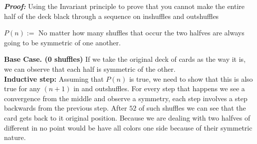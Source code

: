 \documentclass[12pt]{article}
\begin{document}
\begin{enumerate}
\textbf{\textit{Proof: }} Using the Invariant principle to prove that you cannot make the entire half of the deck black through a sequence on inshuffles and outshuffles\\
\begin{center}
    $P(n) := $ No matter how many shuffles that occur the two halfves are always going to be symmetric of one another.
\end{center}
\textbf{ Base Case. (0 shuffles) } If we take the original deck of cards as the way it is, we can observe that each half is symmetric of the other.\\
\textbf{Inductive step: } Assuming that $P(n)$ is true, we need to show that this is also true for any $(n+1)$ in and outshuffles. For every step that happens we see a convergence from the middle and observe a symmetry, each step involves a step backwards from the previous step. After $52$ of such shuffles we can see that the card gets back to it original position. Because we are dealing with two halfves of different in no point would be have all colors one side because of their symmetric nature.
\end{enumerate}
\end{document}

